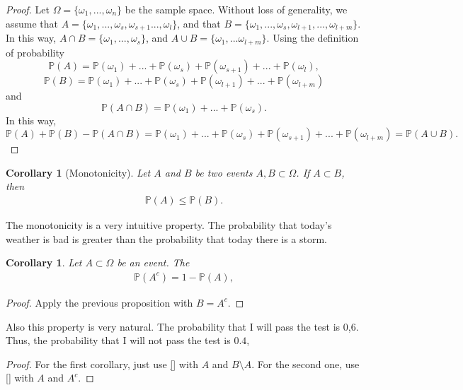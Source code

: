 \documentclass[12pt]{article}
\newtheorem{corollary}[theorem]{Corollary}
\newcommand{\<}{{\langle \!\! \langle}}
\renewcommand{\>}{{\rangle \!\! \rangle}}
\newcommand{\bel}[2]{\begin{equation} \label{#1} \begin{split} #2
 					\end{split} \end{equation}}
\begin{document}
\begin{proof}
Let $\Omega=\{\omega_1,...,\omega_n\}$ be the sample space. Without loss of generality, we assume that $A=\{\omega_1,...,\omega_s,\omega_{s+1}...,\omega_l\}$, and that $B=\{\omega_1,...,\omega_s,\omega_{l+1},...,\omega_{l+m}\}$. In this way, $A\cap B=\{\omega_1,...,\omega_s\}$, and $A\cup B=\{\omega_1,...\omega_{l+m}\}$. Using the definition of probability 
$$\mathbb{P}(A)=\mathbb{P}(\omega_1)+...+\mathbb{P}(\omega_s)+\mathbb{P}(\omega_{s+1})+...+\mathbb{P}(\omega_l),$$
$$
\mathbb{P}(B)=\mathbb{P}(\omega_1)+...+\mathbb{P}(\omega_s)+\mathbb{P}(\omega_{l+1})+...+\mathbb{P}(\omega_{l+m})
$$
and 
$$\mathbb{P}(A\cap B)=\mathbb{P}(\omega_1)+...+\mathbb{P}(\omega_s).$$
In this way, $$\mathbb{P}(A)+\mathbb{P}(B)-\mathbb{P}(A\cap B)=\mathbb{P}(\omega_1)+...+\mathbb{P}(\omega_s)+\mathbb{P}(\omega_{s+1})+...+\mathbb{P}(\omega_{l+m})=\mathbb{P}(A\cup B).$$
\end{proof}
\begin{corollary}[Monotonicity]
Let $A$ and $B$ be two events $A,B\subset\Omega$. If $A\subset B$, then 
\bel{}{\mathbb{P}(A)\leq\mathbb{P}(B).}
\end{corollary}
The monotonicity is a very intuitive property. The probability that today's weather is bad is greater than the probability that today there is a storm. 
\begin{corollary} 
Let $A\subset \Omega$ be an event. The 
\bel{e:compl}{\mathbb{P}(A^c)=1-\mathbb{P}(A),}
\end{corollary}
\begin{proof}
Apply the previous proposition with $B=A^c$.
\end{proof}
Also this property is very natural. The probability that I will pass the test is 0,6. Thus, the probability that I will not pass the test is $0.4$,

\begin{proof}
	For the first corollary, just use \eqref{} with $A$ and $B\setminus A$. For the second one, use \eqref{} with $A$ and $A^c$. 

\end{proof}
\end{document}
